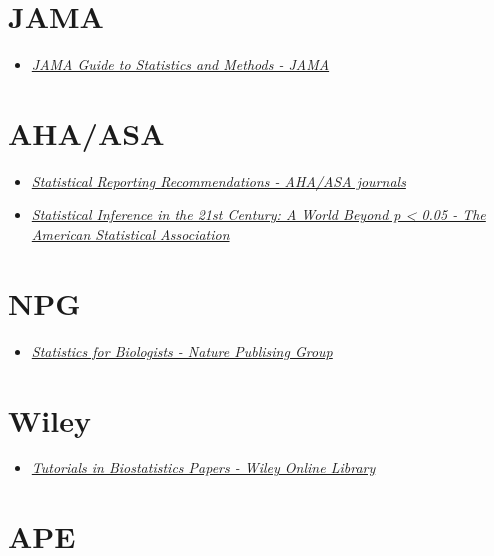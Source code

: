 \documentclass[
]{book}
\providecommand{\tightlist}{%
  \setlength{\itemsep}{0pt}\setlength{\parskip}{0pt}}
\begin{document}
\hypertarget{jama}{%
\section{JAMA}\label{jama}}

\begin{itemize}
\tightlist
\item
  \href{https://jamanetwork.com/collections/44042/jama-guide-to-statistics-and-methods}{\emph{JAMA Guide to Statistics and Methods - JAMA}}
\end{itemize}

\hypertarget{aha-asa}{%
\section{AHA/ASA}\label{aha-asa}}

\begin{itemize}
\item
  \href{https://www.ahajournals.org/statistical-recommendations}{\emph{Statistical Reporting Recommendations - AHA/ASA journals}}
\item
  \href{https://www.tandfonline.com/toc/utas20/73/sup1?nav=tocList}{\emph{Statistical Inference in the 21st Century: A World Beyond p \textless{} 0.05 - The American Statistical Association}}
\end{itemize}

\hypertarget{npg}{%
\section{NPG}\label{npg}}

\begin{itemize}
\tightlist
\item
  \href{https://www.nature.com/collections/qghhqm}{\emph{Statistics for Biologists - Nature Publising Group}}
\end{itemize}

\hypertarget{wiley}{%
\section{Wiley}\label{wiley}}

\begin{itemize}
\tightlist
\item
  \href{https://onlinelibrary.wiley.com/page/journal/10970258/homepage/tutorials.htm}{\emph{Tutorials in Biostatistics Papers - Wiley Online Library}}
\end{itemize}

\hypertarget{ape}{%
\section{APE}\label{ape}}
\end{document}
